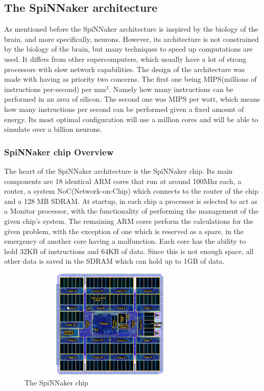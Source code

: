 \documentclass[12pt,a4paper]{article}
\begin{document}
\subsection{The SpiNNaker architecture}
As mentioned before the SpiNNaker architecture is inspired by the biology of the brain, and more specifically, neurons. However, its architecture is not constrained by the biology of the brain, but many techniques to speed up computations are used. It differs from other supercomputers, which  usually have a lot of strong processors with slow network capabilities. The design of the architecture was made with having as priority two concerns. The first one being MIPS(millions of instructions per-second) per mm$^2$. Namely how many instructions can be performed in an area of silicon. The second one was MIPS per watt, which means how many instructions per second can be performed given a fixed amount of energy. Its most optimal configuration will use a million cores and will be able to simulate over a billion neurons\cite{furber2007neural}.
\subsubsection {SpiNNaker chip Overview}
The heart of the SpiNNaker architecture is the SpiNNaker chip. Its main components are 18 identical ARM cores that run at around 100Mhz each, a router, a system NoC(Network-on-Chip) which connects to the router of the chip and a 128 MB SDRAM. At startup, in each chip a processor is selected to act as a Monitor processor, with the functionality of performing the management of the given chip's system. The remaining ARM cores perform the calculations for the given problem, with the exception of one which is reserved as a spare, in the emergency of another core having a malfunction\cite{furber2007neural}. Each core has the ability to hold 32KB of instructions and 64KB of data. Since this is not enough space, all other data is saved in the SDRAM which can hold up to 1GB of data\cite{navaridas2009understanding}.
\begin{figure}[h!]
\includegraphics[width=250pt,height=150pt,scale=2]{Pics/chip.png}
\centering
\caption{The SpiNNaker chip\cite{spinnweb}}
\end{figure}
\end{document}
